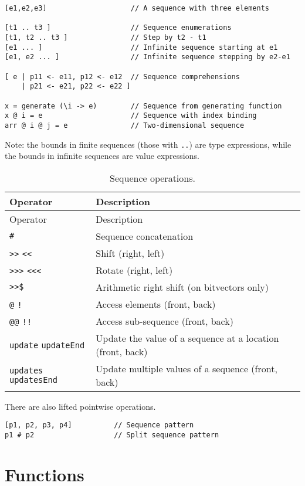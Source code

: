 \begin{verbatim}
[e1,e2,e3]                    // A sequence with three elements

[t1 .. t3 ]                   // Sequence enumerations
[t1, t2 .. t3 ]               // Step by t2 - t1
[e1 ... ]                     // Infinite sequence starting at e1
[e1, e2 ... ]                 // Infinite sequence stepping by e2-e1

[ e | p11 <- e11, p12 <- e12  // Sequence comprehensions
    | p21 <- e21, p22 <- e22 ]

x = generate (\i -> e)        // Sequence from generating function
x @ i = e                     // Sequence with index binding
arr @ i @ j = e               // Two-dimensional sequence
\end{verbatim}

Note: the bounds in finite sequences (those with \texttt{..}) are type
expressions, while the bounds in infinite sequences are value
expressions.

\begin{longtable}[]{@{}ll@{}}
\caption{Sequence operations.}\tabularnewline
\toprule
Operator & Description\tabularnewline
\midrule
\endfirsthead
\toprule
Operator & Description\tabularnewline
\midrule
\endhead
\texttt{\#} & Sequence concatenation\tabularnewline
\texttt{\textgreater{}\textgreater{}} \texttt{\textless{}\textless{}} &
Shift (right, left)\tabularnewline
\texttt{\textgreater{}\textgreater{}\textgreater{}}
\texttt{\textless{}\textless{}\textless{}} & Rotate (right,
left)\tabularnewline
\texttt{\textgreater{}\textgreater{}\$} & Arithmetic right shift (on
bitvectors only)\tabularnewline
\texttt{@} \texttt{!} & Access elements (front, back)\tabularnewline
\texttt{@@} \texttt{!!} & Access sub-sequence (front,
back)\tabularnewline
\texttt{update} \texttt{updateEnd} & Update the value of a sequence at a
location (front, back)\tabularnewline
\texttt{updates} \texttt{updatesEnd} & Update multiple values of a
sequence (front, back)\tabularnewline
\bottomrule
\end{longtable}

There are also lifted pointwise operations.

\begin{verbatim}
[p1, p2, p3, p4]          // Sequence pattern
p1 # p2                   // Split sequence pattern
\end{verbatim}

\hypertarget{functions}{%
\section{Functions}\label{functions}}

